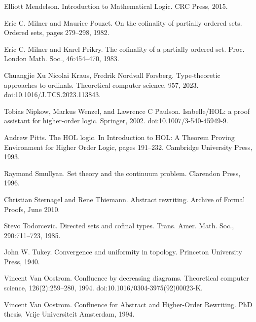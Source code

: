 \par\noindent  [30]  Elliott Mendelson.  Introduction to Mathematical Logic.  CRC Press, 2015.  
 
\par\noindent  [31]  Eric C. Milner and Maurice Pouzet.  On the cofinality of partially ordered sets.  Ordered sets, pages 279–298, 1982.  
 
\par\noindent  [32]  Eric C. Milner and Karel Prikry.  The cofinality of a partially ordered set.  Proc. London Math. Soc., 46:454–470, 1983.  
 
\par\noindent  [33]  Chuangjie Xu Nicolai Kraus, Fredrik Nordvall Forsberg.  Type-theoretic approaches to ordinals.  Theoretical computer science, 957, 2023.  doi:10.1016/J.TCS.2023.113843.  
 
\par\noindent  [34]  Tobias Nipkow, Markus Wenzel, and Lawrence C Paulson.  Isabelle/HOL: a proof assistant for higher-order logic.  Springer, 2002.  doi:10.1007/3-540-45949-9.  
 
\par\noindent  [35]  Andrew Pitts.  The HOL logic.  In Introduction to HOL: A Theorem Proving Environment for Higher Order Logic, pages 191–232. Cambridge University Press, 1993.  
 
\par\noindent  [36]  Raymond Smullyan.  Set theory and the continuum problem.  Clarendon Press, 1996.  
 
\par\noindent  [37]  Christian Sternagel and Rene Thiemann.  Abstract rewriting.  Archive of Formal Proofs, June 2010.  
 
\par\noindent  [38]  Stevo Todorcevic.  Directed sets and cofinal types.  Trans. Amer. Math. Soc., 290:711–723, 1985.  
 
\par\noindent  [39]  John W. Tukey.  Convergence and uniformity in topology.  Princeton University Press, 1940.  
 
\par\noindent  [40]  Vincent Van Oostrom.  Confluence by decreasing diagrams.  Theoretical computer science, 126(2):259–280, 1994.  doi:10.1016/0304-3975(92)00023-K.  
 
\par\noindent  [41]  Vincent Van Oostrom.  Confluence for Abstract and Higher-Order Rewriting.  PhD thesis, Vrije Universiteit Amsterdam, 1994.  
 
